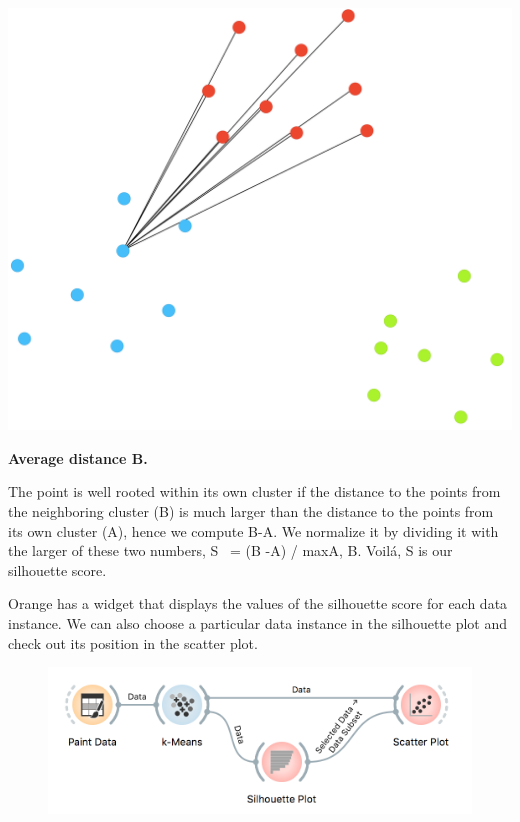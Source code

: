 \begin{marginfigure}
    \centering
    \includegraphics[scale=0.25]{silhouette-pt2.png}
    \caption{\textbf{\textsf{Average distance B.}}}
\end{marginfigure}

The point is well rooted within its own cluster if the distance to the points from the neighboring cluster (B) is much larger than the distance to the points from its own cluster (A), hence we compute B-A. We normalize it by dividing it with the larger of these two numbers, S  = (B -A) / max{A, B}. Voilá, S is our silhouette score.

Orange has a  widget that displays the values of the silhouette score for each data instance. We can also choose a particular data instance in the silhouette plot and check out its position in the scatter plot.


\begin{figure}[h]
    \centering
    \includegraphics[width=\linewidth]{silhouette-workflow.png}
    \caption{$\;$} %
\end{figure}

